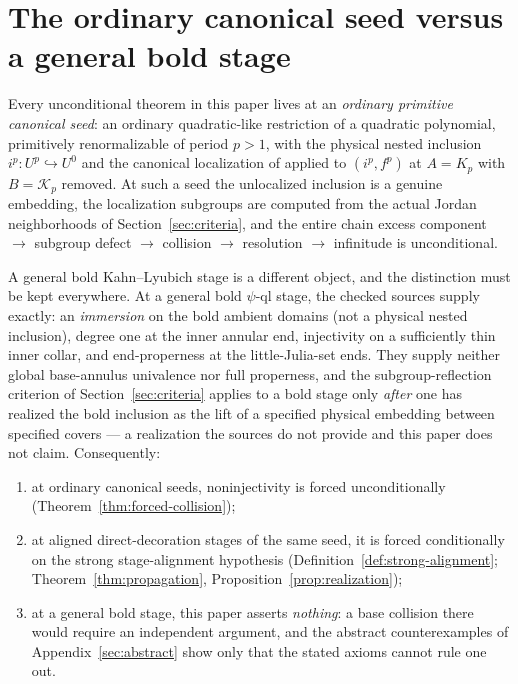 \documentclass[11pt,reqno]{amsart}
\theoremstyle{definition}
\theoremstyle{remark}
\begin{document}
\section{The ordinary canonical seed versus a general bold stage}
\label{sec:seedvsbold}

Every unconditional theorem in this paper lives at an \emph{ordinary
primitive canonical seed}: an ordinary quadratic-like restriction of a
quadratic polynomial, primitively renormalizable of period $p>1$, with
the physical nested inclusion $i^{p}\colon U^{p}\hookrightarrow U^{0}$
and the canonical localization of \cite{KahnPrimitive06} applied to
$(i^{p},f^{p})$ at $A=K_{p}$ with $B=\mathcal K_{p}$ removed.  At such
a seed the unlocalized inclusion is a genuine embedding, the
localization subgroups are computed from the actual Jordan
neighborhoods of Section~\ref{sec:criteria}, and the entire chain
excess component $\to$ subgroup defect $\to$ collision $\to$ resolution
$\to$ infinitude is unconditional.

A general bold Kahn--Lyubich stage is a different object, and the
distinction must be kept everywhere.  At a general bold $\psi$-ql
stage, the checked sources supply exactly: an \emph{immersion} on the
bold ambient domains (not a physical nested inclusion), degree one at
the inner annular end, injectivity on a sufficiently thin inner collar,
and end-properness at the little-Julia-set ends.  They supply neither
global base-annulus univalence nor full properness, and the
subgroup-reflection criterion of Section~\ref{sec:criteria} applies to
a bold stage only \emph{after} one has realized the bold inclusion as
the lift of a specified physical embedding between specified covers ---
a realization the sources do not provide and this paper does not claim.
Consequently:
\begin{enumerate}
\item at ordinary canonical seeds, noninjectivity is forced
  unconditionally (Theorem~\ref{thm:forced-collision});
\item at aligned direct-decoration stages of the same seed, it is
  forced conditionally on the strong stage-alignment hypothesis
  (Definition~\ref{def:strong-alignment};
  Theorem~\ref{thm:propagation},
  Proposition~\ref{prop:realization});
\item at a general bold stage, this paper asserts \emph{nothing}: a
  base collision there would require an independent argument, and the
  abstract counterexamples of Appendix~\ref{sec:abstract} show only
  that the stated axioms cannot rule one out.
\end{enumerate}
\end{document}
